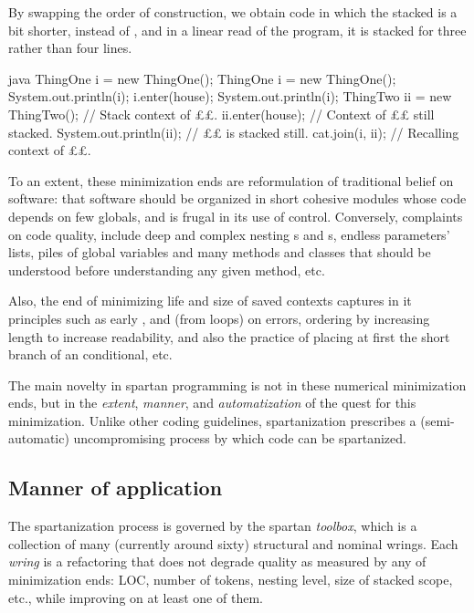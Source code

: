 \begin{enumerate}
  By swapping the order of construction, we obtain code in which the stacked is
  a bit shorter,  instead of , and in a linear read of the
  program, it is stacked for three rather than four lines.
 
\begin{code}[minipage,width=54ex]{java} 
ThingOne i = new ThingOne();
ThingOne i = new ThingOne(); 
System.out.println(i); 
i.enter(house); 
System.out.println(i);        
ThingTwo ii = new ThingTwo(); // Stack context of ££. 
ii.enter(house);              // Context of ££ still stacked.
System.out.println(ii);       // ££ is stacked still.  
cat.join(i, ii);              // Recalling context of ££.
  \end{code}
\end{enumerate}

To an extent, these minimization ends are reformulation of traditional
belief on software: that software should be organized in short cohesive modules
whose code depends on few globals, and is frugal in its use of control.
Conversely, complaints on code quality, include deep and complex nesting
s and s, endless parameters' lists, piles of global variables
and many methods and classes that should be understood before understanding any
given method, etc.

Also, the end of minimizing life and size of saved contexts captures in it
principles such as early ,  and  (from loops) on
errors, ordering by increasing length to increase readability, and also the
practice of placing at first the short branch of an  conditional, etc.

The main novelty in spartan programming is not in these numerical minimization
ends, but in the \emph{extent}, \emph{manner}, and \emph{automatization} of the
quest for this minimization. Unlike other coding guidelines, spartanization
prescribes a (semi-automatic) uncompromising process by which code can be
spartanized.


\subsection{Manner of application}
The spartanization process is governed by the spartan
\emph{toolbox}, which is a collection of many (currently around sixty)
structural and nominal wrings.  Each \emph{wring} is a refactoring that does
not degrade quality as measured by any of minimization ends: LOC, number of
tokens, nesting level, size of stacked scope, etc., while improving on at least
one of them.

